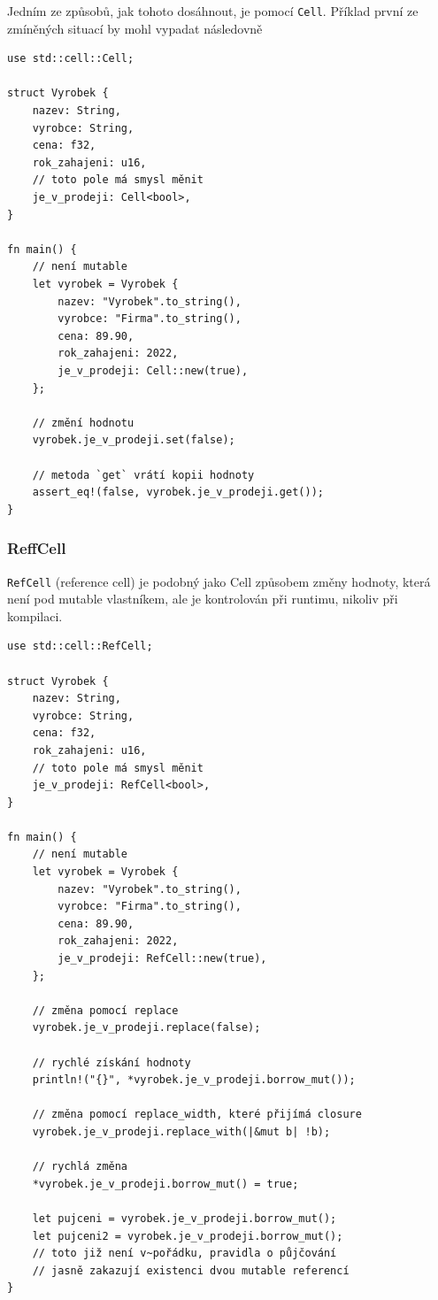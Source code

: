 \documentclass[a4paper, 12pt]{article} %
\newcommand{\rust}[1]{\texttt{#1}}
\begin{document}
			Jedním ze způsobů, jak tohoto dosáhnout, je pomocí \rust{Cell}. Příklad první ze zmíněných situací by mohl vypadat následovně
			\begin{verbatim}
use std::cell::Cell;

struct Vyrobek {
	nazev: String,
	vyrobce: String,
	cena: f32,
	rok_zahajeni: u16,
	// toto pole má smysl měnit
	je_v_prodeji: Cell<bool>,
}

fn main() {
	// není mutable
	let vyrobek = Vyrobek {
		nazev: "Vyrobek".to_string(),
		vyrobce: "Firma".to_string(),
		cena: 89.90,
		rok_zahajeni: 2022,
		je_v_prodeji: Cell::new(true),
	};

	// změní hodnotu
	vyrobek.je_v_prodeji.set(false);

	// metoda `get` vrátí kopii hodnoty
	assert_eq!(false, vyrobek.je_v_prodeji.get());
}
			\end{verbatim}
			\cite{cell}


		\subsubsection*{ReffCell}
			\rust{RefCell} (reference cell) je podobný jako Cell způsobem změny hodnoty, která není pod mutable vlastníkem, ale je kontrolován při runtimu, nikoliv při kompilaci. 
			\begin{verbatim}
use std::cell::RefCell;

struct Vyrobek {
	nazev: String,
	vyrobce: String,
	cena: f32,
	rok_zahajeni: u16,
	// toto pole má smysl měnit
	je_v_prodeji: RefCell<bool>,
}

fn main() {
	// není mutable
	let vyrobek = Vyrobek {
		nazev: "Vyrobek".to_string(),
		vyrobce: "Firma".to_string(),
		cena: 89.90,
		rok_zahajeni: 2022,
		je_v_prodeji: RefCell::new(true),
	};

	// změna pomocí replace
	vyrobek.je_v_prodeji.replace(false);

	// rychlé získání hodnoty
	println!("{}", *vyrobek.je_v_prodeji.borrow_mut());

	// změna pomocí replace_width, které přijímá closure
	vyrobek.je_v_prodeji.replace_with(|&mut b| !b);
	
	// rychlá změna
	*vyrobek.je_v_prodeji.borrow_mut() = true;
	
	let pujceni = vyrobek.je_v_prodeji.borrow_mut();
	let pujceni2 = vyrobek.je_v_prodeji.borrow_mut();
	// toto již není v~pořádku, pravidla o půjčování
	// jasně zakazují existenci dvou mutable referencí
}
			\end{verbatim}
			
\end{document}
